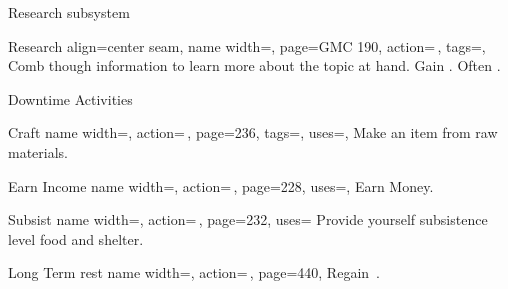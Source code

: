\begin{PageFrontLandscape}
\begin{TablesHalf}{\frontTableHeight}
        \TableSpace
        \begin{Table}{Research subsystem}
            \begin{entry}{Research}{%
                align=center seam,
                name width=\activityLength,%
                page=GMC 190,
                action=\,,
                tags=\Concentrate,
            }
                Comb though information to learn more about the topic at hand.
                Gain  .
                Often \Linguistic.\\
            \end{entry}
        \end{Table}
    \end{TablesHalf}%
    \begin{TablesHalf}{\frontTableHeight}
        \begin{Table}{Downtime Activities}
            \begin{entry}{Craft}{%
                name width=\activityLength,%
                action=\,\TimeDaily,
                page=236,
                tags=\Manipulate,
                uses={\Crafting[tags={T}]},
            }
                Make an item from raw materials.\hfill
            \end{entry}
            \begin{entry}{Earn Income}{%
                name width=\activityLength,%
                action=\,\TimeDaily,
                page=228,
                uses={},
            }
                Earn Money.
            \end{entry}
            \begin{entry}{Subsist}{%
                name width=\activityLength,%
                action=\,,
                page=232,
                uses={}
            }
                Provide yourself subsistence level food and shelter.\hfill
            \end{entry}
            \begin{entry}{Long Term rest}{%
                name width=\activityLength,%
                action=\,,
                page=440,
            }
                Regain \,\HPs. \quad

\end{entry}
\end{Table}
\end{TablesHalf}
\end{PageFrontLandscape}
